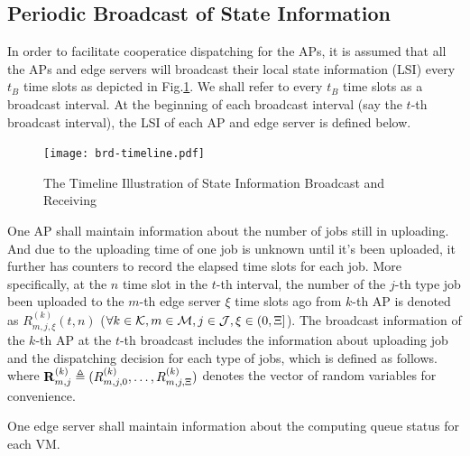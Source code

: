 \subsection{Periodic Broadcast of State Information}
In order to facilitate cooperatice dispatching for the APs, it is assumed that all the APs and edge servers will broadcast their local state information (LSI) every $t_B$ time slots as depicted in Fig.\ref{fig:brd-timeline}.
We shall refer to every $t_B$ time slots as a broadcast interval.
At the beginning of each broadcast interval (say the $t$-th broadcast interval), the LSI of each AP and edge server is defined below.

\begin{figure}[ht]
    \centering
    \texttt{[image: brd-timeline.pdf]}
    \caption{The Timeline Illustration of State Information Broadcast and Receiving}
    \label{fig:brd-timeline}
\end{figure}

One AP shall maintain information about the number of jobs still in uploading. 
And due to the uploading time of one job is unknown until it's been uploaded, it further has counters to record the elapsed time slots for each job.
More specifically, at the $n$ time slot in the $t$-th interval, the number of the $j$-th type job been uploaded to the $m$-th edge server $\xi$ time slots ago from $k$-th AP is denoted as $R^{(k)}_{m,j,\xi}({t,n})$ ($\forall k\in\mathcal{K}, m\in\mathcal{M}, j\in\mathcal{J}, \xi\in(0,\Xi]$).
The broadcast information of the $k$-th AP at the $t$-th broadcast includes the information about uploading job and the dispatching decision for each type of jobs, which is defined as follows.
where $\mathbf{R}^{(k)}_{m,j} \triangleq ( R^{(k)}_{m,j,0},\dots,R^{(k)}_{m,j,\Xi} )$ denotes the vector of random variables for convenience.

One edge server shall maintain information about the computing queue status for each VM.

